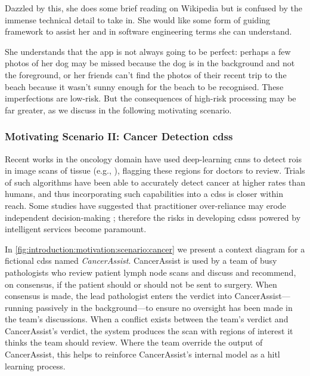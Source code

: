 Dazzled by this, she does some brief reading on Wikipedia but is confused by the immense technical detail to take in. She would like some form of guiding framework to assist her and in software engineering terms she can understand.

She understands that the app is not always going to be perfect: perhaps a few photos of her dog may be missed because the dog is in the background and not the foreground, or her friends can't find the photos of their recent trip to the beach because it wasn't sunny enough for the beach to be recognised. These imperfections are low-risk. But the consequences of high-risk processing may be far greater, as we discuss in the following motivating scenario.


\subsubsection{Motivating Scenario II: Cancer Detection \gls{cdss}}
\label{ssec:introduction:motivation:scenario:cancer}

Recent works in the oncology domain have used deep-learning \glspl{cnn} to detect \glspl{roi} in image scans of tissue (e.g., \citep{Liu:2018fa,Haenssle:2018bz,EhteshamiBejnordi:2017kq}), flagging these regions for doctors to review. Trials of such algorithms have been able to accurately detect cancer at higher rates than humans, and thus incorporating such capabilities into a \gls{cdss} is closer within reach. Some studies have suggested that practitioner over-reliance may erode independent decision-making \citep{Jaspers:2011hy,Chambers:1991uh}; therefore the risks in developing \glspl{cdss} powered by intelligent services become paramount.

In \cref{fig:introduction:motivation:scenario:cancer} we present a context diagram for a fictional \gls{cdss} named \textit{CancerAssist}. CancerAssist is used by a team of busy pathologists who review patient lymph node scans and discuss and recommend, on consensus, if the patient should or should not be sent to surgery. When consensus is made, the lead pathologist enters the verdict into CancerAssist---running passively in the background---to ensure no oversight has been made in the team's discussions. When a conflict exists between the team's verdict and CancerAssist's verdict, the system produces the scan with regions of interest it thinks the team should review. Where the team override the output of CancerAssist, this helps to reinforce CancerAssist's internal model as a \gls{hitl} learning process.

